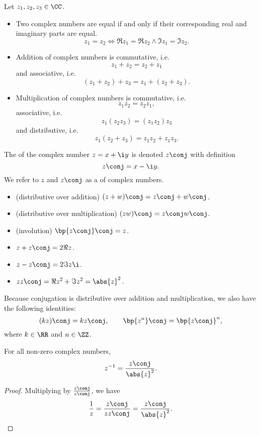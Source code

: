 \begin{fact}
    Let $z_1, z_2, z_3 \in \CC$.
    \begin{itemize}
        \item Two complex numbers are equal if and only if their corresponding real and imaginary parts are equal. \[z_1 = z_2 \iff \Re z_1 = \Re z_2 \land \Im z_1 = \Im z_2.\]
        \item Addition of complex numbers is commutative, i.e. \[z_1 + z_2 = z_2 + z_1\] and associative, i.e. \[(z_1 + z_2) + z_3 = z_1 + (z_2 + z_3).\]
        \item Multiplication of complex numbers is commutative, i.e. \[z_1z_2 = z_2z_1,\] associative, i.e. \[z_1(z_2z_3) = (z_1z_2)z_3\] and distributive, i.e. \[z_1(z_2 + z_3) = z_1z_2 + z_1z_3.\]
    \end{itemize}
\end{fact}

\begin{definition}
    The  of the complex number $z = x + \i y$ is denoted $z\conj$ with definition \[z\conj = x - \i y.\] We refer to $z$ and $z\conj$ as a  of complex numbers.
\end{definition}

\begin{fact}
    \phantom{.}
    \begin{itemize}
        \item (distributive over addition) $(z + w)\conj = z\conj + w\conj$.
        \item (distributive over multiplication) $(zw)\conj = z\conj w\conj$.
        \item (involution) $\bp{z\conj}\conj = z$.
        \item $z + z\conj = 2\Re{z}$.
        \item $z - z\conj = 2\Im{z} \i$.
        \item $z z\conj = \Re{z}^2 + \Im{z}^2 = \abs{z}^2$.
    \end{itemize}
\end{fact}
\begin{remark}
    Because conjugation is distributive over addition and multiplication, we also have the following identities: \[(kz)\conj = k z\conj, \qquad \bp{z^n}\conj = \bp{z\conj}^n,\] where $k \in \RR$ and $n \in \ZZ$.
\end{remark}

\begin{proposition}
    For all non-zero complex numbers, \[z^{-1} = \frac{z\conj}{\abs{z}^2}.\]
\end{proposition}
\begin{proof}
    Multiplying by $\frac{z\conj}{z\conj}$, we have \[\frac{1}{z} = \frac{z\conj}{z z\conj} = \frac{z\conj}{\abs{z}^2}.\]
\end{proof}

